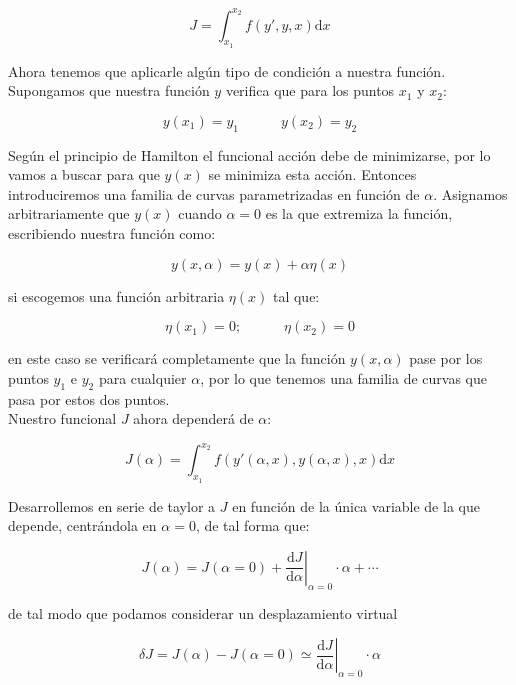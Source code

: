 \documentclass[12pt,a4paper]{book}
\newcommand{\D}{\mathrm{d}}
\newcommand{\tquad}{\quad \quad \quad}
\begin{document}
\begin{equation}
J = \int_{x_1}^{x_2} f(y',y,x) \D x 
\end{equation}

Ahora tenemos que aplicarle algún tipo de condición a nuestra función. Supongamos que nuestra función $y$ verifica que para los puntos $x_1$ y $x_2$:

\begin{equation}
y(x_1) = y_1 \tquad y(x_2) = y_2
\end{equation}

Según el principio de Hamilton el funcional acción debe de minimizarse, por lo vamos a buscar para que $y(x)$ se minimiza esta acción. Entonces introduciremos una familia de curvas parametrizadas en función de $\alpha$. Asignamos arbitrariamente que $y(x)$ cuando $\alpha=0$ es la que extremiza la función, escribiendo nuestra función como:

\begin{equation}
y (x,\alpha) = y(x) + \alpha \eta (x)
\end{equation}

si escogemos una función arbitraria $\eta(x)$ tal que:

\begin{equation}
\eta (x_1) = 0; \tquad \eta(x_2) = 0
\end{equation}

en este caso se verificará completamente que la función $y(x,\alpha)$ pase por los puntos $y_1$ e $y_2$ para cualquier $\alpha$, por lo que tenemos una familia de curvas que pasa por estos dos puntos. \\

Nuestro funcional $J$ ahora dependerá de $\alpha$:

\begin{equation}
J(\alpha) = \int_{x_1}^{x_2} f(y'(\alpha,x),y(\alpha,x),x) \D x 
\end{equation}

Desarrollemos en serie de taylor a $J$ en función de la única variable de la que depende, centrándola en $\alpha = 0$, de tal forma que:

\begin{equation}
J(\alpha) = J(\alpha = 0) +  \left. \dfrac{\D J}{\D \alpha} \right|_{\alpha = 0} \cdot \alpha + \cdots
\end{equation}

de tal modo que podamos considerar un desplazamiento virtual

\begin{equation}
\delta J = J (\alpha) - J(\alpha = 0) \simeq \left. \dfrac{\D J}{\D \alpha} \right|_{\alpha = 0} \cdot \alpha
\end{equation}
\end{document}
